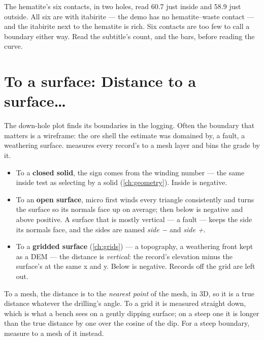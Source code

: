 The hematite's six contacts, in two holes, read 60.7 just inside and 58.9 just outside. All six are with itabirite — the demo has no hematite–waste contact — and the itabirite next to the hematite is rich. Six contacts are too few to call a boundary either way. Read the subtitle's count, and the bars, before reading the curve.

\section{To a surface: Distance to a surface…}\label{sec:contact-surface}
The down-hole plot finds its boundaries in the logging. Often the boundary that matters is a wireframe: the ore shell the estimate was domained by, a fault, a weathering surface.  measures every record's  to a mesh layer and bins the grade by it.

\begin{itemize}
\item To a \textbf{closed solid}, the sign comes from the winding number — the same inside test as selecting by a solid (\cref{ch:geometry}). Inside is negative.
\item To an \textbf{open surface}, micro first winds every triangle consistently and turns the surface so its normals face up on average; then below is negative and above positive. A surface that is mostly vertical — a fault — keeps the side its normals face, and the sides are named \emph{side −} and \emph{side +}.
\item To a \textbf{gridded surface} (\cref{ch:grids}) — a topography, a weathering front kept as a DEM — the distance is \emph{vertical}: the record's elevation minus the surface's at the same x and y. Below is negative. Records off the grid are left out.
\end{itemize}

To a mesh, the distance is to the \emph{nearest point} of the mesh, in 3D, so it is a true distance whatever the drilling's angle. To a grid it is measured straight down, which is what a bench sees on a gently dipping surface; on a steep one it is longer than the true distance by one over the cosine of the dip. For a steep boundary, measure to a mesh of it instead.

